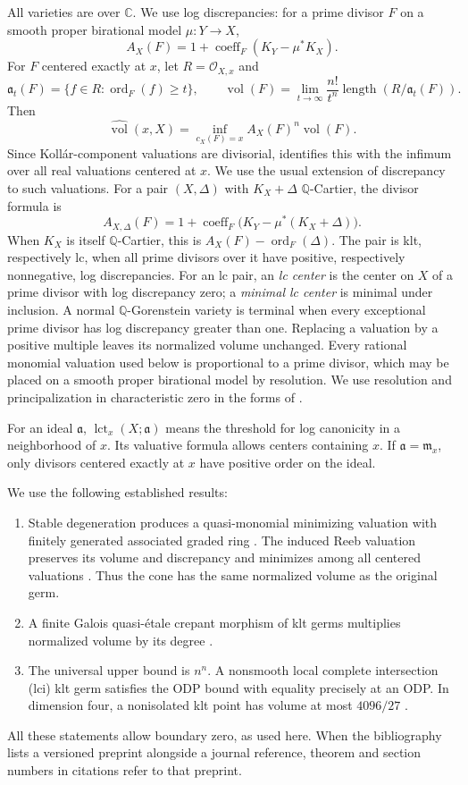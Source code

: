 \documentclass[11pt]{article}
\theoremstyle{definition}
\theoremstyle{remark}
\numberwithin{equation}{section}
\newcommand{\C}{\mathbb C}
\newcommand{\Q}{\mathbb Q}
\newcommand{\m}{\mathfrak m}
\newcommand{\nvol}{\widehat{\operatorname{vol}}}
\newcommand{\ord}{\operatorname{ord}}
\newcommand{\vol}{\operatorname{vol}}
\newcommand{\lct}{\operatorname{lct}}
\newcommand{\length}{\operatorname{length}}
\newcommand{\cO}{\mathcal O}
\begin{document}
All varieties are over \(\C\). We use log discrepancies: for a prime divisor \(F\) on a smooth proper birational model \(\mu:Y\to X\),
\[
A_X(F)=1+\operatorname{coeff}_F(K_Y-\mu^*K_X).
\]
For \(F\) centered exactly at \(x\), let \(R=\cO_{X,x}\) and
\[
\mathfrak a_t(F)=\{f\in R:\ord_F(f)\ge t\},\qquad
\vol(F)=\lim_{t\to\infty}\frac{n!}{t^n}
\length(R/\mathfrak a_t(F)).
\]
Then
\[
\nvol(x,X)=\inf_{c_X(F)=x}A_X(F)^n\vol(F).
\]
Since Koll\'ar-component valuations are divisorial, \cite[Theorem~2.5]{LiXu} identifies this with the infimum over all real valuations centered at \(x\). We use the usual extension of discrepancy to such valuations. For a pair \((X,\Delta)\) with \(K_X+\Delta\) \(\Q\)-Cartier, the divisor formula is
\[
A_{X,\Delta}(F)=1+\operatorname{coeff}_F\bigl(K_Y-\mu^*(K_X+\Delta)\bigr).
\]
When \(K_X\) is itself \(\Q\)-Cartier, this is \(A_X(F)-\ord_F(\Delta)\). The pair is klt, respectively lc, when all prime divisors over it have positive, respectively nonnegative, log discrepancies. For an lc pair, an \emph{lc center} is the center on \(X\) of a prime divisor with log discrepancy zero; a \emph{minimal lc center} is minimal under inclusion. A normal \(\Q\)-Gorenstein variety is terminal when every exceptional prime divisor has log discrepancy greater than one. Replacing a valuation by a positive multiple leaves its normalized volume unchanged. Every rational monomial valuation used below is proportional to a prime divisor, which may be placed on a smooth proper birational model by resolution. We use resolution and principalization in characteristic zero in the forms of \cite[Theorems~26--27]{KollarResolution}.

For an ideal \(\mathfrak a\), \(\lct_x(X;\mathfrak a)\) means the threshold for log canonicity in a neighborhood of \(x\). Its valuative formula allows centers containing \(x\). If \(\mathfrak a=\m_x\), only divisors centered exactly at \(x\) have positive order on the ideal.

We use the following established results:
\begin{enumerate}[label=(\roman*)]
\item Stable degeneration produces a quasi-monomial minimizing valuation with finitely generated associated graded ring \cite[Theorem~1.2]{XZstable}. The induced Reeb valuation preserves its volume and discrepancy and minimizes among all centered valuations \cite[Lemma~4.10 and Theorem~1.3]{LiXu}. Thus the cone has the same normalized volume as the original germ.
\item A finite Galois quasi-étale crepant morphism of klt germs multiplies normalized volume by its degree \cite[Theorem~1.3]{XZfinite}.
\item The universal upper bound is \(n^n\). A nonsmooth local complete intersection (lci) klt germ satisfies the ODP bound with equality precisely at an ODP. In dimension four, a nonisolated klt point has volume at most \(4096/27\) \cite[Theorems~2.11--2.12 and Corollary~2.18]{Liu}.
\end{enumerate}
All these statements allow boundary zero, as used here. When the bibliography lists a versioned preprint alongside a journal reference, theorem and section numbers in citations refer to that preprint.
\end{document}
